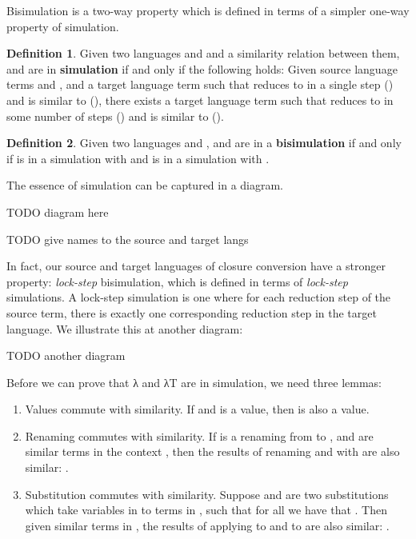 \documentclass[bsc,frontabs,twoside,singlespacing,parskip,deptreport]{infthesis}
\theoremstyle{definition}
\newtheorem*{definition}{Definition}
\begin{document}
Bisimulation is a two-way property which is defined in terms of a
simpler one-way property of simulation.

\begin{definition}{}
Given two languages  and  and a similarity relation
\AS{\_\textasciitilde\_}
between them,  and  are in \textbf{simulation} if and only
if the following holds:
Given source language terms  and , and a target language
term  such that  reduces to  in a single step () and
 is similar to  (), there exists a target
language term  such that  reduces to  in some
number of steps () and  is similar to  ().
\end{definition}

\begin{definition}
Given two languages  and ,   and  are in a
\textbf{bisimulation} if and only if  is in a simulation with  and
 is in a simulation with .
\end{definition}

The essence of simulation can be captured in a diagram.

TODO diagram here

TODO give names to the source and target langs

In fact, our source and target languages of closure conversion have a
stronger property: \textit{lock-step} bisimulation, which is defined
in terms of \textit{lock-step} simulations. A lock-step simulation is
one where for each reduction step of the source term, there is exactly
one corresponding reduction step in the target language. We illustrate
this at another diagram:

TODO another diagram

Before we can prove that λ and λT are in simulation, we need three
lemmas:

\begin{enumerate}
\item
  Values commute with similarity. If  and  is a
  value, then  is also a value.

\item
  Renaming commutes with similarity. If  is a renaming from
   to , and  are similar terms in the context
  , then the results of renaming  and  with 
  are also similar: .

\item
  Substitution commutes with similarity. Suppose  and  are two
  substitutions which take variables  in  to terms in ,
  such that for all  we have that . Then given similar terms  in , the results
  of applying  to  and  to  are also
  similar: .
\end{enumerate}
\end{document}
